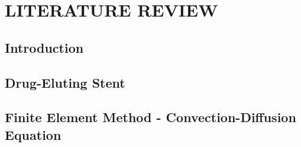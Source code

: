 \chapter{\textbf{LITERATURE REVIEW}}

\section{\textbf{Introduction}} 


\section{\textbf{Drug-Eluting Stent}} 


\section{\textbf{Finite Element Method - Convection-Diffusion Equation}} 



